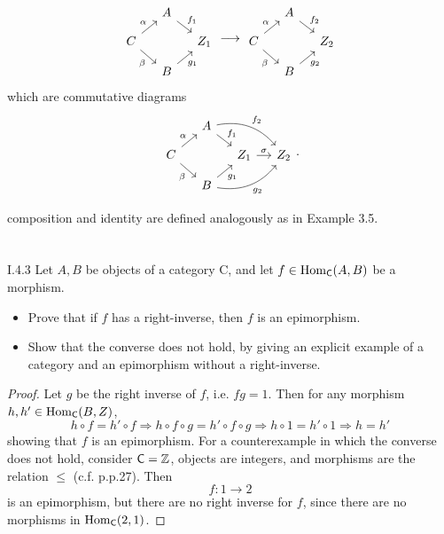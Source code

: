\begin{solution}
\begin{itemize}
\[\begin{tikzcd}[column sep=small, row sep=small]
&A \arrow[dr, "f_1"] \\
C\arrow[ur, "\alpha"]\arrow[dr, "\beta"'] & &Z_1 \\
&B \arrow[ur, "g_1"']
\end{tikzcd}     
\longrightarrow
\begin{tikzcd}[column sep=small, row sep=small]
&A \arrow[dr, "f_2"] \\
C\arrow[ur, "\alpha"]\arrow[dr, "\beta"'] & &Z_2 \\
&B \arrow[ur, "g_2"']
\end{tikzcd}  
\]
which are commutative diagrams
\[
\begin{tikzcd}[column sep=small, row sep=small]
& A \arrow[rd, "f_1"] \arrow[rrd, bend left, "f_2"]  &  &   \\
C \arrow[ru, "\alpha"] \arrow[rd, "\beta"'] &  & Z_1 \arrow[r, "\sigma"] & Z_2 \\
& B \arrow[ru, "g_1"'] \arrow[rru, bend right, "g_2"'] &  &    
\end{tikzcd}.
\]
\end{itemize}
composition and identity are defined analogously as in Example 3.5. 
\end{solution}


\section{}
\begin{problem}{I.4.3}
Let $A,B$ be objects of a category \textsf{C}, and let $f \in \operatorname{Hom}_\mathsf{C}(A,B)$ be a morphism.
\begin{itemize}
\setlength\itemsep{0pt}
\item Prove that if $f$ has a right-inverse, then $f$ is an epimorphism.
\item Show that the converse does not hold, by giving an explicit example of a category and an epimorphism without a right-inverse.
\end{itemize}
\end{problem}
\begin{proof}
Let $g$ be the right inverse of $f$, i.e. $fg = 1$. Then for any morphism $h, h' \in \operatorname{Hom}_\mathsf{C}(B,Z)$,
\[
h \circ f = h' \circ f \Rightarrow h \circ f \circ g = h' \circ f \circ g \Rightarrow h \circ 1 = h' \circ 1 \Rightarrow h = h'
\]
showing that $f$ is an epimorphism. For a counterexample in which the converse does not hold, consider $\mathsf{C} = \mathbb{Z}$, objects are integers, and morphisms are the relation $\leq$ (c.f. p.p.27). Then
\[
f : 1 \to 2	
\]
is an epimorphism, but there are no right inverse for $f$, since there are no morphisms in $\operatorname{Hom}_\mathsf{C}(2,1)$.
\end{proof}

